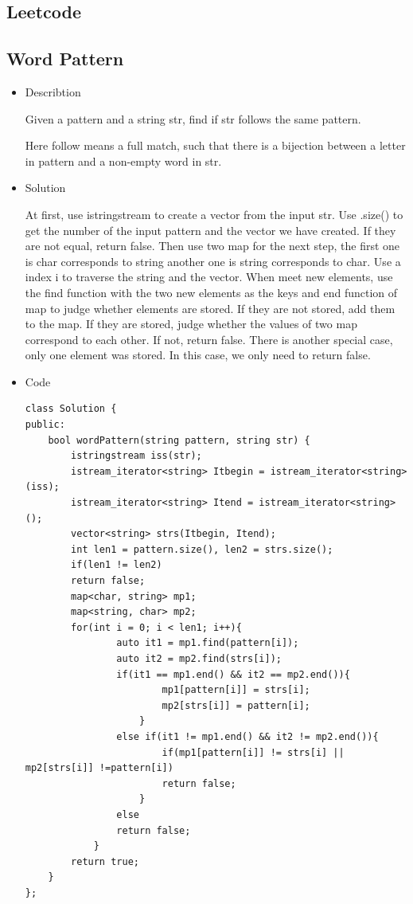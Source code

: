 \documentclass[10pt]{article}
\begin{document}
    \begin{center}
        \section*{Leetcode}
    \end{center}
    \subsection*{Word Pattern}
    \begin{itemize}
        \item Describtion
        \begin{flushleft}
            Given a pattern and a string str, find if str follows the same pattern.

            Here follow means a full match, such that there is a bijection between a letter in pattern and a non-empty word in str.
        \end{flushleft}

        \item Solution
        \begin{flushleft}
            At first, use istringstream to create a vector from the input str. Use .size() to get the number of the input pattern and the vector we have created. If they are not equal, return false. Then use two map for the next step, the first one is char corresponds to string another one is string corresponds to char. Use a index i to traverse the string and the vector. When meet new elements, use the find function with the two new elements as the keys and end function of map to judge whether elements are stored. If they are not stored, add them to the map. If they are stored, judge whether the values of two map correspond to each other. If not, return false. There is another special case, only one element was stored. In this case, we only need to return false.
        \end{flushleft}

        \item Code
        \begin{lstlisting}
class Solution {
public:
	bool wordPattern(string pattern, string str) {
		istringstream iss(str);
		istream_iterator<string> Itbegin = istream_iterator<string>(iss);
		istream_iterator<string> Itend = istream_iterator<string>();
		vector<string> strs(Itbegin, Itend);
		int len1 = pattern.size(), len2 = strs.size();
		if(len1 != len2)
		return false;
		map<char, string> mp1;
		map<string, char> mp2;
		for(int i = 0; i < len1; i++){
				auto it1 = mp1.find(pattern[i]);
				auto it2 = mp2.find(strs[i]);
				if(it1 == mp1.end() && it2 == mp2.end()){
						mp1[pattern[i]] = strs[i];
						mp2[strs[i]] = pattern[i];
					}
				else if(it1 != mp1.end() && it2 != mp2.end()){
						if(mp1[pattern[i]] != strs[i] || mp2[strs[i]] !=pattern[i])
						return false;
					}
				else
				return false;
			}
		return true;
	}
};
        \end{lstlisting}
    \end{itemize}
\end{document}
